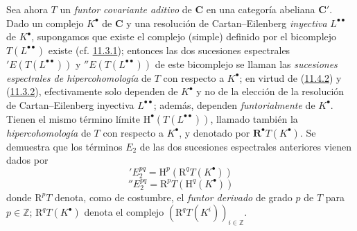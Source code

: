 \begin{env}[11.4.3]
\label{0.11.4.3}
\label{0.11.4.3-fr}
Sea ahora $T$ un \emph{funtor covariante aditivo} de $\boldsymbol{C}$ en una categoría abeliana $\boldsymbol{C}'$.
Dado un complejo $K^\bullet$ de $\boldsymbol{C}$ y una resolución de Cartan--Eilenberg \emph{inyectiva} $L^{\bullet\bullet}$ de $K^\bullet$, supongamos que existe el complejo (simple) definido por el bicomplejo $T(L^{\bullet\bullet})$ existe
(cf. \hyperref[0.11.3.1-fr]{11.3.1}); entonces las dos sucesiones espectrales
$'E(T(L^{\bullet\bullet}))$ y $''E(T(L^{\bullet\bullet}))$ de este bicomplejo se llaman las \emph{sucesiones espectrales de hipercohomología} de $T$ con respecto a $K^\bullet$; en virtud de (\hyperref[0.11.4.2-fr]{11.4.2}) y (\hyperref[0.11.3.2-fr]{11.3.2}), efectivamente solo dependen de $K^\bullet$ y no de la elección de la resolución de Cartan--Eilenberg inyectiva $L^{\bullet\bullet}$;
además, dependen \emph{funtorialmente} de $K^\bullet$.
Tienen el mismo término límite $\mathrm H^\bullet(T(L^{\bullet\bullet}))$, llamado también la \emph{hipercohomología} de $T$ con respecto a $K^\bullet$, y denotado por $\mathbf R^\bullet T(K^\bullet)$.
Se demuestra que los términos $E_2$ de las dos sucesiones espectrales anteriores vienen dados por
\[
  \label{0.11.4.3.1-fr}
  'E_2^{pq}=\mathrm H^p(\mathrm R^qT(K^\bullet))
  \tag{11.4.3.1}
\]
\[
  \label{0.11.4.3.2-fr}
  ''E_2^{pq}=\mathrm R^pT(\mathrm H^q(K^\bullet))
  \tag{11.4.3.2}
\]
donde $\mathrm R^pT$ denota, como de costumbre, el \emph{funtor derivado} de grado $p$ de $T$ para $p\in\mathbb Z$;
$\mathrm R^qT(K^\bullet)$ denota el complejo $(\mathrm R^qT(K^i))_{i\in\mathbb Z}$.
\end{env}


